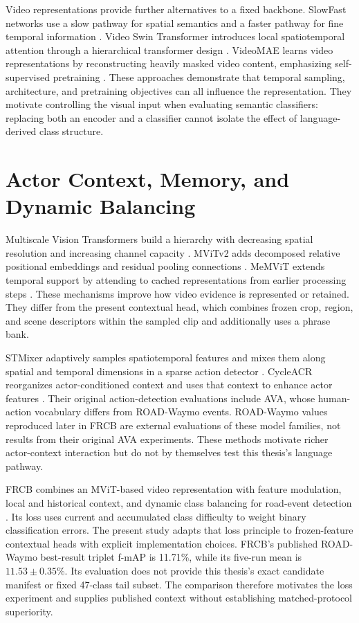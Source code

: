 Video representations provide further alternatives to a fixed backbone. SlowFast networks use a slow pathway for spatial semantics and a faster pathway for fine temporal information \cite{slowfast}. Video Swin Transformer introduces local spatiotemporal attention through a hierarchical transformer design \cite{video-swin}. VideoMAE learns video representations by reconstructing heavily masked video content, emphasizing self-supervised pretraining \cite{videomae}. These approaches demonstrate that temporal sampling, architecture, and pretraining objectives can all influence the representation. They motivate controlling the visual input when evaluating semantic classifiers: replacing both an encoder and a classifier cannot isolate the effect of language-derived class structure.

\section{Actor Context, Memory, and Dynamic Balancing}

Multiscale Vision Transformers build a hierarchy with decreasing spatial resolution and increasing channel capacity \cite{mvit}. MViTv2 adds decomposed relative positional embeddings and residual pooling connections \cite{mvitv2}. MeMViT extends temporal support by attending to cached representations from earlier processing steps \cite{memvit}. These mechanisms improve how video evidence is represented or retained. They differ from the present contextual head, which combines frozen crop, region, and scene descriptors within the sampled clip and additionally uses a phrase bank.

STMixer adaptively samples spatiotemporal features and mixes them along spatial and temporal dimensions in a sparse action detector \cite{stmixer}. CycleACR reorganizes actor-conditioned context and uses that context to enhance actor features \cite{cycleacr}. Their original action-detection evaluations include AVA, whose human-action vocabulary differs from ROAD-Waymo events. ROAD-Waymo values reproduced later in FRCB are external evaluations of these model families, not results from their original AVA experiments. These methods motivate richer actor-context interaction but do not by themselves test this thesis's language pathway.

FRCB combines an MViT-based video representation with feature modulation, local and historical context, and dynamic class balancing for road-event detection \cite{frcb}. Its loss uses current and accumulated class difficulty to weight binary classification errors. The present study adapts that loss principle to frozen-feature contextual heads with explicit implementation choices. FRCB's published ROAD-Waymo best-result triplet f-mAP is 11.71\%, while its five-run mean is \(11.53\pm0.35\)\%. Its evaluation does not provide this thesis's exact candidate manifest or fixed 47-class tail subset. The comparison therefore motivates the loss experiment and supplies published context without establishing matched-protocol superiority.

